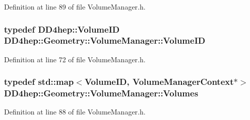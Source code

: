 Definition at line 89 of file VolumeManager.h.\hypertarget{class_d_d4hep_1_1_geometry_1_1_volume_manager_ab1f746b561c93be38bc7c6e66fc8ca8a}{
\subsubsection[{VolumeID}]{\setlength{\rightskip}{0pt plus 5cm}typedef DD4hep::VolumeID {\bf DD4hep::Geometry::VolumeManager::VolumeID}}}
\label{class_d_d4hep_1_1_geometry_1_1_volume_manager_ab1f746b561c93be38bc7c6e66fc8ca8a}


Definition at line 72 of file VolumeManager.h.\hypertarget{class_d_d4hep_1_1_geometry_1_1_volume_manager_a81625fd63b37636f0b4019b102aba787}{
\subsubsection[{Volumes}]{\setlength{\rightskip}{0pt plus 5cm}typedef std::map$<${\bf VolumeID}, {\bf VolumeManagerContext}$\ast$$>$ {\bf DD4hep::Geometry::VolumeManager::Volumes}}}
\label{class_d_d4hep_1_1_geometry_1_1_volume_manager_a81625fd63b37636f0b4019b102aba787}


Definition at line 88 of file VolumeManager.h.

